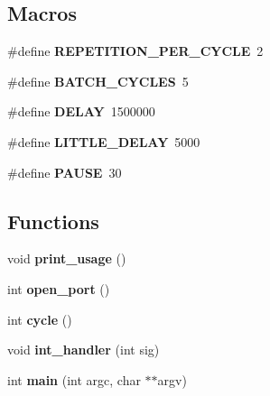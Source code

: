 \subsection*{Macros}
\begin{DoxyCompactItemize}
\item 
\mbox{\label{qbmove__test_8c_af24db198f37e801244816f9a63c126c3}} 
\#define {\bfseries R\+E\+P\+E\+T\+I\+T\+I\+O\+N\+\_\+\+P\+E\+R\+\_\+\+C\+Y\+C\+LE}~2
\item 
\mbox{\label{qbmove__test_8c_ac8d39f4363ce5ae611e4713705f13a04}} 
\#define {\bfseries B\+A\+T\+C\+H\+\_\+\+C\+Y\+C\+L\+ES}~5
\item 
\mbox{\label{qbmove__test_8c_a62249e384b997229a3e2ae74ade334e2}} 
\#define {\bfseries D\+E\+L\+AY}~1500000
\item 
\mbox{\label{qbmove__test_8c_a7a0ea3b7c06c69e1a12a585114ffb6b1}} 
\#define {\bfseries L\+I\+T\+T\+L\+E\+\_\+\+D\+E\+L\+AY}~5000
\item 
\mbox{\label{qbmove__test_8c_a5666ac5930c9f903698073ab1fa694f7}} 
\#define {\bfseries P\+A\+U\+SE}~30
\end{DoxyCompactItemize}
\subsection*{Functions}
\begin{DoxyCompactItemize}
\item 
\mbox{\label{qbmove__test_8c_ae5ad5cbeccaedc03a48d3c7eaa803e79}} 
void {\bfseries print\+\_\+usage} ()
\item 
\mbox{\label{qbmove__test_8c_abe553924eef0ba8079dc745caf1f348c}} 
int {\bfseries open\+\_\+port} ()
\item 
\mbox{\label{qbmove__test_8c_ab0dc12b72fe52d07687632cf2d31295d}} 
int {\bfseries cycle} ()
\item 
\mbox{\label{qbmove__test_8c_aa2bbc30ab4adea656f93d184270b0463}} 
void {\bfseries int\+\_\+handler} (int sig)
\item 
\mbox{\label{qbmove__test_8c_a3c04138a5bfe5d72780bb7e82a18e627}} 
int {\bfseries main} (int argc, char $\ast$$\ast$argv)
\end{DoxyCompactItemize}
